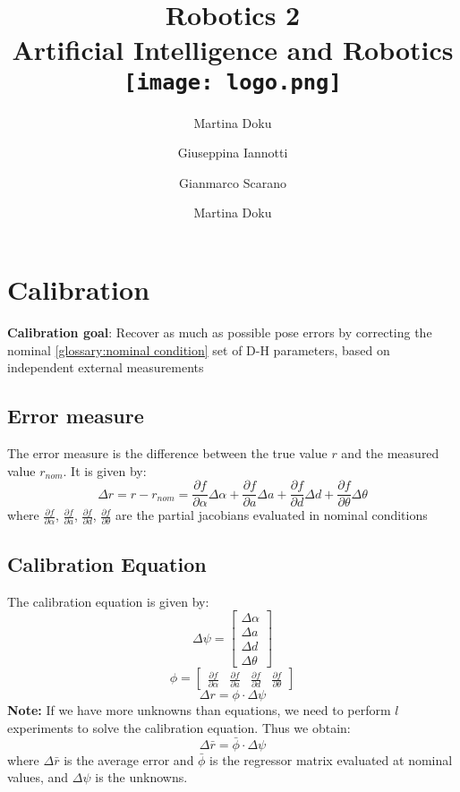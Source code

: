 \documentclass[a4paper,12pt]{article}
\title{
    \Huge{Robotics 2}\\
    \large{Artificial Intelligence and Robotics}\\
    \vspace{1cm}
    \texttt{[image: logo.png]}
}
\author{Martina Doku \and Giuseppina Iannotti \and Gianmarco Scarano}
\author{Martina Doku}
\begin{document}
\maketitle
\newpage

\tableofcontents
\newpage

\section{Calibration}
\textbf{Calibration goal}:  Recover as 
much as possible pose
errors by correcting the nominal \ref{glossary:nominal condition}
set of D-H parameters,
based on independent external measurements
\subsection{Error measure}
The error measure is the difference between the true value $r$ and the
 measured value $r_{nom}$. It is given by:
\begin{equation}
  \Delta r = r - r_{nom} = \frac{\partial f}{\partial \alpha} \Delta \alpha + \frac{\partial f}{\partial a} \Delta a + \frac{\partial f}{\partial d} \Delta d + \frac{\partial f}{\partial \theta} \Delta \theta
\end{equation}
where $\frac{\partial f}{\partial \alpha}$, $\frac{\partial f}{\partial a}$, $\frac{\partial f}{\partial d}$, $\frac{\partial f}{\partial \theta}$ are the partial 
jacobians evaluated in nominal conditions
\subsection{Calibration Equation}
The calibration equation is given by:
\begin{equation}
    \Delta \psi = \begin{bmatrix}
        \Delta \alpha \\
        \Delta a \\
        \Delta d \\
        \Delta \theta
    \end{bmatrix}
\end{equation}
\begin{equation}
    \phi= \begin{bmatrix}
     \frac{\partial f}{\partial \alpha} & \frac{\partial f}{\partial a} & \frac{\partial f}{\partial d} & \frac{\partial f}{\partial \theta}
    \end{bmatrix}
\end{equation}
\begin{equation}
    \Delta r= \phi \cdot \Delta \psi
\end{equation}
\textbf{Note:} If we have more unknowns than equations, we need to perform 
$l$ experiments to solve the calibration equation. Thus we obtain:
\begin{equation}
    \Delta \bar{r}= \bar{\phi} \cdot \Delta \psi
\end{equation}
where $\Delta \bar{r}$ is the average error 
and $\bar{\phi}$ is the regressor matrix evaluated at nominal values,
and $\Delta \psi$ is the unknowns.
\end{document}
